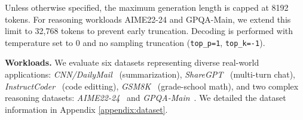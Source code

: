 \documentclass{article}
\newcommand{\lily}[1]{\textcolor{blue}{Lily: #1}}
\newcommand{\jerry}[1]{\textcolor{cyan}{Jerry: #1}}
\begin{document}
Unless otherwise specified, the maximum generation length is capped at 8192 tokens.
For reasoning workloads AIME22-24 and GPQA-Main, we extend this limit to 32,768 tokens to prevent early truncation.
Decoding is performed with temperature set to 0 and no sampling truncation (\texttt{top\_p=1}, \texttt{top\_k=-1}).

\textbf{Workloads.}
We evaluate six datasets representing diverse real-world applications:
\textit{CNN/DailyMail}~\cite{hermann2015teaching, see-etal-2017-get} (summarization),
\textit{ShareGPT}~\cite{sharegpt} (multi-turn chat),
\textit{InstructCoder}~\cite{li2024instructcoder} (code editting),
\textit{GSM8K}~\cite{cobbe2021gsm8k} (grade-school math),
and two complex reasoning datasets: \textit{AIME22-24}~\cite{AIME-AoPS, AIME-HF} and \textit{GPQA-Main}~\cite{rein2023gpqagraduatelevelgoogleproofqa}. We detailed the dataset information in Appendix \autoref{appendix:dataset}. 




\end{document}
